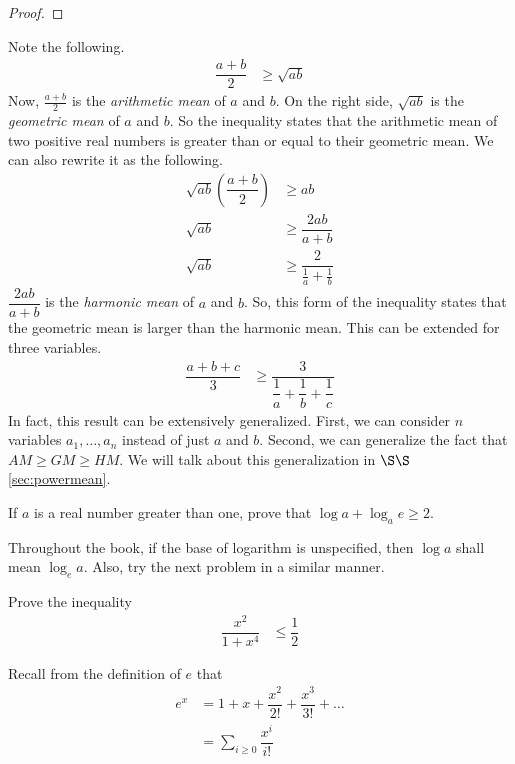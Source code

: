 \documentclass{subfile}
\begin{document}
		\begin{proof}
			
		\end{proof}
	Note the following.
		\begin{align*}
			\dfrac{a+b}{2}
				& \geq\sqrt{ab}
		\end{align*}
	Now, $\frac{a+b}{2}$ is the \emph{arithmetic mean} of $a$ and $b$. On the right side, $\sqrt{ab}$ is the \emph{geometric mean} of $a$ and $b$. So the inequality states that the arithmetic mean of two positive real numbers is greater than or equal to their geometric mean. We can also rewrite it as the following.
		\begin{align*}
			\sqrt{ab}\left(\dfrac{a+b}{2}\right)
				& \geq ab\\
			\sqrt{ab}
				& \geq\dfrac{2ab}{a+b}\\
			\sqrt{ab}
				& \geq\dfrac{2}{\frac{1}{a}+\frac{1}{b}}
		\end{align*}
	$\dfrac{2ab}{a+b}$ is the \emph{harmonic mean} of $a$ and $b$. So, this form of the inequality states that the geometric mean is larger than the harmonic mean. This can be extended for three variables.
		\begin{align*}
			\dfrac{a+b+c}{3}
				& \geq\dfrac{3}{\dfrac{1}{a}+\dfrac{1}{b}+\dfrac{1}{c}}
		\end{align*}
	In fact, this result can be extensively generalized. First, we can consider $n$ variables $a_1,\ldots,a_n$ instead of just $a$ and $b$. Second, we can generalize the fact that $AM\geq GM\geq HM$. We will talk about this generalization in \hyperref[sec:powermean]{$\S\S$\ref*{sec:powermean}}.
		\begin{problem}
			If $a$ is a real number greater than one, prove that $\log{a}+\log_{a}{e}\geq2$.
		\end{problem}
	Throughout the book, if the base of logarithm is unspecified, then $\log{a}$ shall mean $\log_{e}{a}$. Also, try the next problem in a similar manner.
		\begin{problem}
			Prove the inequality
				\begin{align*}
					\dfrac{x^2}{1+x^4}
						& \leq\dfrac{1}{2}
				\end{align*}
		\end{problem}
	Recall from the definition of $e$ that
		\begin{align*}
			e^x
				& = 1+x+\dfrac{x^2}{2!}+\dfrac{x^3}{3!}+\ldots\\
				& = \sum_{i\geq0}\dfrac{x^i}{i!}
		\end{align*}
\end{document}
